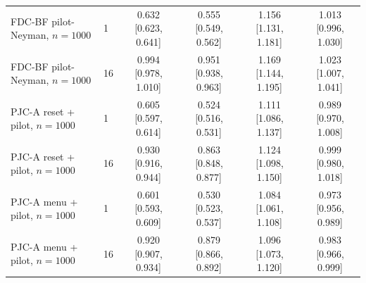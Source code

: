 \begin{table}[t]
\begin{tabular}{llcccc}
\midrule
FDC-BF pilot-Neyman, $n{=}1000$ & 1 & 0.632 {\scriptsize[0.623, 0.641]} & 0.555 {\scriptsize[0.549, 0.562]} & 1.156 {\scriptsize[1.131, 1.181]} & 1.013 {\scriptsize[0.996, 1.030]} \\
FDC-BF pilot-Neyman, $n{=}1000$ & 16 & 0.994 {\scriptsize[0.978, 1.010]} & 0.951 {\scriptsize[0.938, 0.963]} & 1.169 {\scriptsize[1.144, 1.195]} & 1.023 {\scriptsize[1.007, 1.041]} \\
PJC-A reset + pilot, $n{=}1000$ & 1 & 0.605 {\scriptsize[0.597, 0.614]} & 0.524 {\scriptsize[0.516, 0.531]} & 1.111 {\scriptsize[1.086, 1.137]} & 0.989 {\scriptsize[0.970, 1.008]} \\
PJC-A reset + pilot, $n{=}1000$ & 16 & 0.930 {\scriptsize[0.916, 0.944]} & 0.863 {\scriptsize[0.848, 0.877]} & 1.124 {\scriptsize[1.098, 1.150]} & 0.999 {\scriptsize[0.980, 1.018]} \\
PJC-A menu + pilot, $n{=}1000$ & 1 & 0.601 {\scriptsize[0.593, 0.609]} & 0.530 {\scriptsize[0.523, 0.537]} & 1.084 {\scriptsize[1.061, 1.108]} & 0.973 {\scriptsize[0.956, 0.989]} \\
PJC-A menu + pilot, $n{=}1000$ & 16 & 0.920 {\scriptsize[0.907, 0.934]} & 0.879 {\scriptsize[0.866, 0.892]} & 1.096 {\scriptsize[1.073, 1.120]} & 0.983 {\scriptsize[0.966, 0.999]} \\
\bottomrule
\end{tabular}
\end{table}
